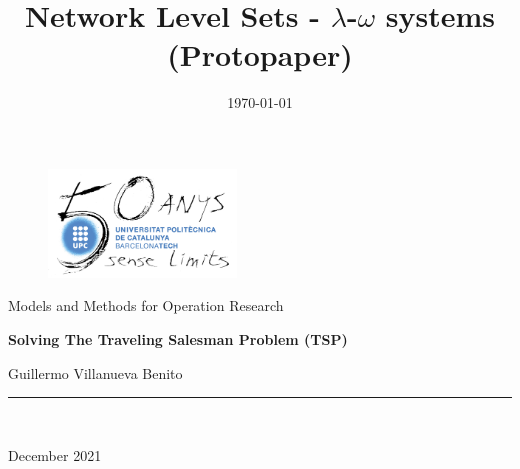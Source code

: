 \documentclass[12pt]{article}
\title{Network Level Sets - \( \lambda\)-\(\omega\) systems  (Protopaper)}
\author{}
\date{\today}
\begin{document}
\begin{titlepage}

\begin{center}
\vspace*{-1in}
\begin{figure}[htb]
\begin{center}
\includegraphics[width=5cm]{logo_upc.jpeg}
\end{center}
\end{figure}

\begin{Large}
Models and Methods for Operation Research\\
\end{Large}
\vspace{4cm}
\vspace*{0.2in}
\begin{Huge}
\textbf{Solving The Traveling Salesman Problem (TSP)}\\
\end{Huge}
\vspace*{0.3in}
\begin{large}
Guillermo Villanueva Benito\\
\end{large}
\vspace*{0.3in}
\rule{80mm}{0.1mm}\\
\vspace*{0.1in}
\begin{large}
December 2021 \\
\end{large}
\end{center}

\end{titlepage}



\newpage

\tableofcontents
\newpage

\end{document}
